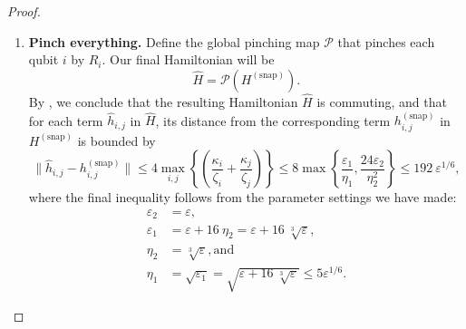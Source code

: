 \documentclass[11pt]{article}
\theoremstyle{plain}
\newcommand{\eps}{\varepsilon}
\renewcommand{\cP}{\mathcal{P}}
\newcommand{\snp}{{(\mathrm{snap})}}
\begin{document}
\begin{proof}
\begin{enumerate}
Now, we will use transitivity: we know that $\|[B_i^\beta, A_i^{\alpha^*}]\| \leq \eps_2$ and $\|[A_i^{\alpha^*}, R_i]\| \leq \eps_2$, so by , we can conclude that 
\begin{equation}
    \| [B_i^\beta, R_i] \| \leq \frac{6\eps_2}{\Delta(A_i^{\alpha^*})} \leq \frac{6 \eps_2}{\eta_2},
\end{equation}
where we are assuming that $\eps_2 \leq \eta_2$ and moreover that the terms of the Hamiltonian have operator norm at most $1$. So, we have
\[ \| [h^\snp_{i,k}, R_i \otimes I_k ] \| \leq \frac{24\eps_2}{\eta_2}. \]
    \item \textbf{Pinch everything.} Define the global pinching map $\cP$ that pinches each qubit $i$ by $R_i$. Our final Hamiltonian will be
    \[ \widehat{H} = \cP(H^\snp).\]
    By , we conclude that the resulting Hamiltonian $\widehat{H}$ is commuting, and that for each term $\widehat{h}_{i,j}$ in $\widehat{H}$, its distance from the corresponding term $h^\snp_{i,j}$ in $H^\snp$ is bounded by 
    \[ \|\hat{h}_{i,j} - h^\snp_{i,j} \| \leq  4\max_{i,j} \left\{ \left(\frac{\kappa_i}{\zeta_i} + \frac{\kappa_j}{\zeta_j} \right) \right\} \leq 8 \max\left\{ \frac{\eps_1}{\eta_1}, \frac{24\eps_2}{\eta_2^2} \right\} \leq 192\ \eps^{1/6}, \]
where the final inequality follows from the parameter settings we have made:
    \begin{align}
        \eps_2 &= \eps,\\
        \eps_1 &= \eps + 16\ \eta_2 = \eps + 16\ \sqrt[3]{\eps},\\
        \eta_2 &= \sqrt[3]{\eps}, \text{and}\label{ineq:eta_2}\\
        \eta_1 &= \sqrt{\eps_1} = \sqrt{\eps + 16\ \sqrt[3]{\eps}} \leq 5 \eps^{1/6}.\label{ineq:eta_1}
    \end{align}
\end{enumerate}



\end{proof}
\end{document}
